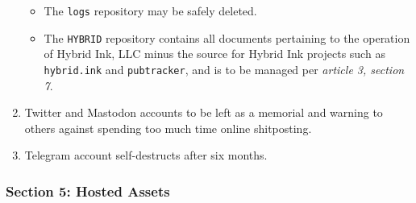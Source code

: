 \begin{enumerate}
  \begin{itemize}
  \tightlist
  \item
    The \texttt{logs} repository may be safely deleted.
  \item
    The \texttt{HYBRID} repository contains all documents pertaining to the operation of Hybrid Ink, LLC minus the source for Hybrid Ink projects such as \texttt{hybrid.ink} and \texttt{pubtracker}, and is to be managed per \emph{article 3, section 7}.
  \end{itemize}
\item
  Twitter and Mastodon accounts to be left as a memorial and warning to others against spending too much time online shitposting.
\item
  Telegram account self-destructs after six months.
\end{enumerate}

\subsubsection*{Section 5: Hosted Assets}\label{section-5-hosted-assets}

